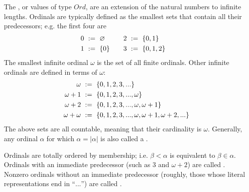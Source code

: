 \documentclass[preprint]{sigplanconf}
\begin{document}
The , or values of type $Ord$, are an extension of the natural numbers to infinite lengths.
Ordinals are typically defined as the smallest sets that contain all their predecessors; e.g. the first four are
\begin{equation}
\begin{aligned}
	\begin{aligned}
		0 &\ := \ \varnothing \\
		1 &\ := \ \{{0}\}
	\end{aligned}
	&\ \ \ \ \ \ 
	\begin{aligned}
		2 &\ := \ \{{0,1}\} \\
		3 &\ := \ \{{0,1,2}\}
	\end{aligned}
\end{aligned}
\end{equation}
The smallest infinite ordinal $\omega$ is the set of all finite ordinals.
Other infinite ordinals are defined in terms of $\omega$:
\begin{equation}
\begin{aligned}
	\omega &\ := \ \set{0,1,2,3,...} \\
	\omega+1 &\ := \ \set{0,1,2,3,...,\omega} \\
	\omega+2 &\ := \ \set{0,1,2,3,...,\omega,\omega+1} \\
	\omega+\omega &\ := \ \set{0,1,2,3,...,\omega,\omega+1,\omega+2,...}
\end{aligned}
\end{equation}
The above sets are all countable, meaning that their cardinality is $\omega$.
Generally, any ordinal $\alpha$ for which $\alpha = |\alpha|$ is also called a .%

Ordinals are totally ordered by membership; i.e. $\beta < \alpha$ is equivalent to $\beta \in \alpha$.
Ordinals with an immediate predecessor (such as $3$ and $\omega+2$) are called .
Nonzero ordinals without an immediate predecessor (roughly, those whose literal representations end in ``$...$'') are called .
\end{document}
